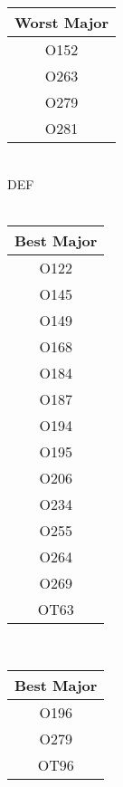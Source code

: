 \begin{multicols}{2}
\begin{center}
    \begin{tabular}{|c|}
        \hline 
        Worst Major \\
        \hline 
        O152\\
        \hline 
        O263\\
        \hline 
        O279\\
        \hline 
        O281\\
        \hline
    \end{tabular}
    \\
    DEF\\
    \\
    \begin{tabular}{|c|}
        \hline 
        Best Major \\
        \hline 
        O122 \\
        \hline
        O145 \\
        \hline
        O149 \\
        \hline
        O168 \\
        \hline
        O184 \\
        \hline
        O187 \\
        \hline
        O194 \\
        \hline
        O195 \\
        \hline
        O206 \\
        \hline
        O234 \\
        \hline
        O255 \\
        \hline
        O264 \\
        \hline
        O269 \\
        \hline
        OT63 \\
        \hline
    \end{tabular}
    \\
    
     \begin{tabular}{|c|}
        \hline 
        Best Major \\
        \hline 
        O196 \\
        \hline 
        O279 \\
        \hline 
        OT96 \\
        \hline 
    \end{tabular}

\end{center}

\end{multicols}
